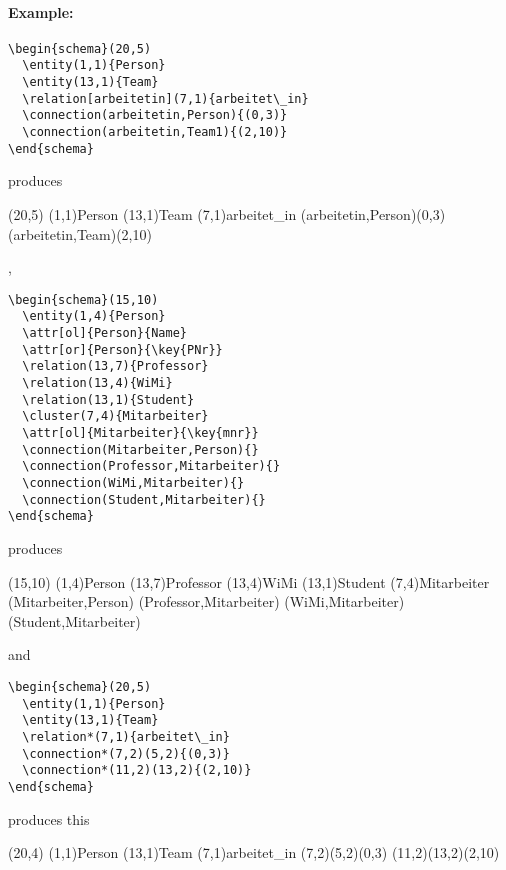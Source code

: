 \documentclass[a4paper,11pt]{article}
\begin{document}
\paragraph{Example:}

\begin{verbatim}
\begin{schema}(20,5)
  \entity(1,1){Person}
  \entity(13,1){Team}
  \relation[arbeitetin](7,1){arbeitet\_in}
  \connection(arbeitetin,Person){(0,3)}
  \connection(arbeitetin,Team1){(2,10)}
\end{schema}
\end{verbatim}

produces

\begin{schema}(20,5)
  \entity(1,1){Person}
  \entity(13,1){Team}
  \relation[arbeitetin](7,1){arbeitet\_in}
  \connection(arbeitetin,Person){(0,3)}
  \connection(arbeitetin,Team){(2,10)}
\end{schema}

, 

\begin{verbatim}
\begin{schema}(15,10)
  \entity(1,4){Person}
  \attr[ol]{Person}{Name}
  \attr[or]{Person}{\key{PNr}}
  \relation(13,7){Professor}
  \relation(13,4){WiMi}
  \relation(13,1){Student}
  \cluster(7,4){Mitarbeiter}
  \attr[ol]{Mitarbeiter}{\key{mnr}}
  \connection(Mitarbeiter,Person){}
  \connection(Professor,Mitarbeiter){}
  \connection(WiMi,Mitarbeiter){}
  \connection(Student,Mitarbeiter){}
\end{schema}
\end{verbatim}

produces

\begin{schema}(15,10)
  \entity(1,4){Person}
  \relation(13,7){Professor}
  \relation(13,4){WiMi}
  \relation(13,1){Student}
  \cluster(7,4){Mitarbeiter}
  \connection(Mitarbeiter,Person){}
  \connection(Professor,Mitarbeiter){}
  \connection(WiMi,Mitarbeiter){}
  \connection(Student,Mitarbeiter){}
\end{schema}

and 

\begin{verbatim}
\begin{schema}(20,5)
  \entity(1,1){Person}
  \entity(13,1){Team}
  \relation*(7,1){arbeitet\_in}
  \connection*(7,2)(5,2){(0,3)}
  \connection*(11,2)(13,2){(2,10)}
\end{schema}
\end{verbatim}

produces this

\begin{schema}(20,4)
  \entity(1,1){Person}
  \entity(13,1){Team}
  \relation*(7,1){arbeitet\_in}
  \connection*(7,2)(5,2){(0,3)}
  \connection*(11,2)(13,2){(2,10)}
\end{schema}
\end{document}
